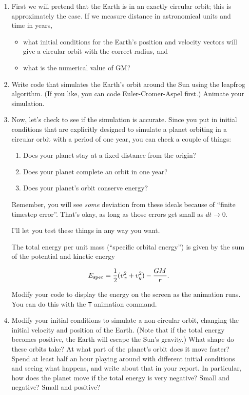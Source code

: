 \documentclass[12pt]{article}
\begin{document}
\begin{enumerate}
\item{First we will pretend that the Earth is in an exactly circular orbit;
this is approximately the case. If we measure distance in astronomical units
and time in years,
\begin{itemize}
\item{what initial conditions for the Earth's position and velocity 
vectors will give a circular orbit with the correct radius, and}
\item{what is the numerical value of GM?}
\end{itemize}

}

\item Write code that simulates the Earth's orbit around the Sun using the leapfrog algorithm. (If you like, you can code Euler-Cromer-Aspel first.) 
Animate your simulation.

\item{Now, let's check to see if the simulation is accurate. Since you put in initial conditions that are explicitly designed to simulate a planet orbiting in a circular
orbit with a period of one year, you can check a couple of things:

\begin{enumerate}
\item Does your planet stay at a fixed distance from the origin?
\item Does your planet complete an orbit in one year?
\item Does your planet's orbit conserve energy?
\end{enumerate}

Remember, you will see {\it some} deviation from these ideals because of ``finite timestep error''. That's okay, as long as those errors get small as $dt \rightarrow 0$.

I'll let you test these things in any way you want.

The total energy per unit mass (``specific orbital energy'') is given by the sum of the potential and kinetic energy

\begin{equation}
E_{\rm spec}=\frac{1}{2}(v_x^2+v_y^2) - \frac{GM}{r}.
\end{equation}

Modify your code to display the energy on the screen as the animation runs. You can do this with the {\tt T} animation command. 
}


\item{Modify your initial conditions to simulate a non-circular orbit, changing the initial velocity and position of the Earth. (Note that if the total energy becomes positive, the Earth will escape the Sun's gravity.) What shape do these orbits take? At what part of the planet's orbit does it move faster? Spend at 
least half an hour playing around with different initial conditions and seeing
what happens, and write about that in your report. In particular, how does the planet move if the total energy is very negative? Small and negative? Small and positive?}


\end{enumerate}
\end{document}
